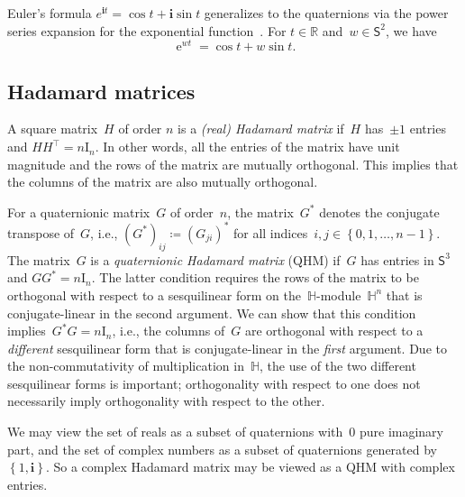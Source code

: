 \documentclass[12pt]{article}
\numberwithin{equation}{section}
\newcommand{\qi}{\mathbf{i}}
\newcommand{\HH}{\mathbb{H}}
\newcommand{\R}{\mathbb{R}}
\newcommand{\adjoint}{*}
\newcommand{\eqdef}{\coloneqq}
\newcommand{\set}[1]{\left\{ #1 \right\}}
\DeclareMathOperator{\e}{e}
\newcommand{\id}{{\mathrm I}}
\newcommand{\qsphere}{{\mathsf S}}
\begin{document}
Euler's formula $e^{\qi t}=\cos t+\qi\sin t$ generalizes to the quaternions via the power series expansion for the exponential function~\cite{Cho98-demoivre}. For $t \in \R$ and~$w\in \qsphere^2$, we have
\begin{equation*}
\label{eq-euler}
\e^{wt} = \cos t + w \sin t .
\end{equation*}

\subsection{Hadamard matrices}\label{sec:matrices}

A square matrix~$H$ of order $n$ is a \emph{(real) Hadamard matrix\/} if~$H$ has~$\pm1$ entries and $HH^\top = n \id_n$. In other words, all the entries of the matrix have unit magnitude and the rows of the matrix are mutually orthogonal. This implies that the columns of the matrix are also mutually orthogonal.

For a quaternionic matrix~$G$ of order~$n$, the matrix~$G^\adjoint$ denotes the conjugate transpose of~$G$, i.e., $(G^\adjoint)_{ij} \eqdef (G_{ji})^*$ for all 
indices~$i,j \in \set{0,1, \dotsc, n-1}$. 
The matrix~$G$ is a \emph{quaternionic Hadamard matrix\/} (QHM) if~$G$ has entries in $\qsphere^3$ and $G G^\adjoint = n\id_n$. The latter condition requires the rows of the matrix to be orthogonal with respect to a sesquilinear form on the~$\HH$-module~$\HH^n$ that is conjugate-linear in the second argument. We can show that this condition implies~$G^\adjoint G = n \id_n$, i.e., the columns of~$G$ are orthogonal with respect to a \emph{different\/} sesquilinear form that is conjugate-linear in the \emph{first\/} argument. Due to the non-commutativity of multiplication in~$\HH$, the use of the two different sesquilinear forms is important; orthogonality with respect to one does not necessarily imply orthogonality with respect to the other.

We may view the set of reals as a subset of quaternions with~$0$ pure imaginary part, and the set of complex numbers as a subset of quaternions generated by~$\set{1,\qi}$. So a complex Hadamard matrix may be viewed as a QHM with complex entries.
\end{document}
